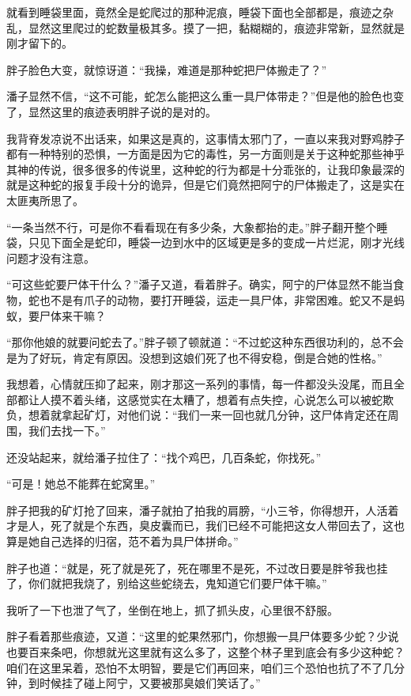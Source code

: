 就看到睡袋里面，竟然全是蛇爬过的那种泥痕，睡袋下面也全部都是，痕迹之杂乱，显然这里爬过的蛇数量极其多。摸了一把，黏糊糊的，痕迹非常新，显然就是刚才留下的。

胖子脸色大变，就惊讶道：“我操，难道是那种蛇把尸体搬走了？”

潘子显然不信，“这不可能，蛇怎么能把这么重一具尸体带走？”但是他的脸色也变了，显然这里的痕迹表明胖子说的是对的。

我背脊发凉说不出话来，如果这是真的，这事情太邪门了，一直以来我对野鸡脖子都有一种特别的恐惧，一方面是因为它的毒性，另一方面则是关于这种蛇那些神乎其神的传说，很多很多的传说里，这种蛇的行为都是十分乖张的，让我印象最深的就是这种蛇的报复手段十分的诡异，但是它们竟然把阿宁的尸体搬走了，这是实在太匪夷所思了。

“一条当然不行，可是你不看看现在有多少条，大象都抬的走。”胖子翻开整个睡袋，只见下面全是蛇印，睡袋一边到水中的区域更是多的变成一片烂泥，刚才光线问题才没有注意。

“可这些蛇要尸体干什么？”潘子又道，看着胖子。确实，阿宁的尸体显然不能当食物，蛇也不是有爪子的动物，要打开睡袋，运走一具尸体，非常困难。蛇又不是蚂蚁，要尸体来干嘛？

“那你他娘的就要问蛇去了。”胖子顿了顿就道：“不过蛇这种东西很功利的，总不会是为了好玩，肯定有原因。没想到这娘们死了也不得安稳，倒是合她的性格。”

我想着，心情就压抑了起来，刚才那这一系列的事情，每一件都没头没尾，而且全部都让人摸不着头绪，这感觉实在太糟了，想着有点失控，心说怎么可以被蛇欺负，想着就拿起矿灯，对他们说：“我们一来一回也就几分钟，这尸体肯定还在周围，我们去找一下。”

还没站起来，就给潘子拉住了：“找个鸡巴，几百条蛇，你找死。”

“可是！她总不能葬在蛇窝里。”

胖子把我的矿灯抢了回来，潘子就拍了拍我的肩膀，“小三爷，你得想开，人活着才是人，死了就是个东西，臭皮囊而已，我们已经不可能把这女人带回去了，这也算是她自己选择的归宿，范不着为具尸体拼命。”

胖子也道：“就是，死了就是死了，死在哪里不是死，不过改日要是胖爷我也挂了，你们就把我烧了，别给这些蛇绕去，鬼知道它们要尸体干嘛。”

我听了一下也泄了气了，坐倒在地上，抓了抓头皮，心里很不舒服。

胖子看着那些痕迹，又道：“这里的蛇果然邪门，你想搬一具尸体要多少蛇？少说也要百来条吧，你想就光这里就有这么多了，这整个林子里到底会有多少这种蛇？咱们在这里呆着，恐怕不太明智，要是它们再回来，咱们三个恐怕也抗了不了几分钟，到时候挂了碰上阿宁，又要被那臭娘们笑话了。”

